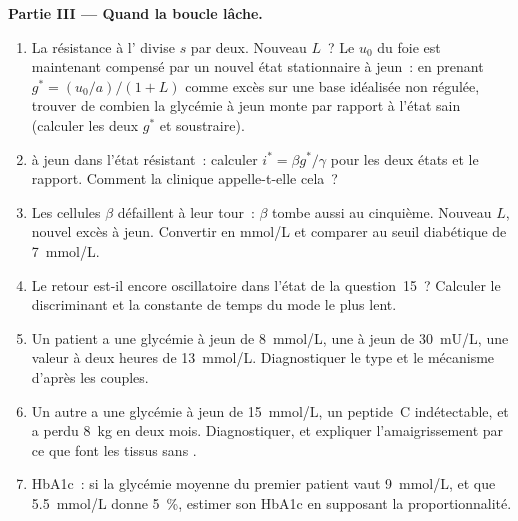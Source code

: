 \begin{problem}
\medskip
\noindent\textbf{Partie III --- Quand la boucle lâche.}
\begin{enumerate}[resume]
  \item La résistance à l' divise $s$ par deux. Nouveau $L$~? Le
        $u_{0}$ du foie est maintenant compensé par un nouvel état
        stationnaire à jeun~: en prenant $g^{*} = (u_{0}/a)/(1
        + L)$ comme excès sur une base idéalisée non régulée, trouver de
        combien la glycémie à jeun monte par rapport à l'état sain
        (calculer les deux $g^{*}$ et soustraire).
  \item {} à jeun dans l'état résistant~: calculer $i^{*} = \beta
        g^{*}/\gamma$ pour les deux états et le rapport. Comment la
        clinique appelle-t-elle cela~?
  \item Les cellules $\beta$ défaillent à leur tour~: $\beta$ tombe aussi
        au cinquième. Nouveau $L$, nouvel excès à jeun. Convertir en
        mmol/L et comparer au seuil diabétique de \qty{7}{mmol/L}.
  \item Le retour est-il encore oscillatoire dans l'état de la
        question~15~? Calculer le discriminant et la constante de temps
        du mode le plus lent.
  \item Un patient a une glycémie à jeun de \qty{8}{mmol/L}, une
         à jeun de \qty{30}{mU/L}, une valeur à deux heures de
        \qty{13}{mmol/L}. Diagnostiquer le type et le mécanisme d'après
        les couples.
  \item Un autre a une glycémie à jeun de \qty{15}{mmol/L}, un
        peptide~C indétectable, et a perdu \qty{8}{kg} en deux mois.
        Diagnostiquer, et expliquer l'amaigrissement par ce que font les
        tissus sans .
  \item HbA1c~: si la glycémie moyenne du premier patient vaut
        \qty{9}{mmol/L}, et que \qty{5.5}{mmol/L} donne \qty{5}{\%},
        estimer son HbA1c en supposant la proportionnalité.
\end{enumerate}


\end{problem}
